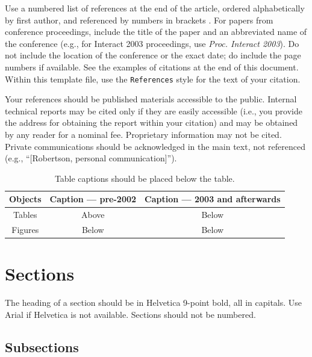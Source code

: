 \documentclass{sigchi}
\newcommand\tabhead[1]{\small\textbf{#1}}
\begin{document}
Use a numbered list of references at the end of the article, ordered
alphabetically by first author, and referenced by numbers in brackets
\cite{ethics,
  Klemmer:2002:WSC:503376.503378,
  Mather:2000:MUT,
  Zellweger:2001:FAO:504216.504224}. For
papers from conference proceedings, include the title of the paper and
an abbreviated name of the conference (e.g., for Interact 2003
proceedings, use \textit{Proc. Interact 2003}). Do not include the
location of the conference or the exact date; do include the page
numbers if available. See the examples of citations at the end of this
document. Within this template file, use the \texttt{References} style
for the text of your citation.

Your references should be published materials accessible to the
public.  Internal technical reports may be cited only if they are
easily accessible (i.e., you provide the address for obtaining the
report within your citation) and may be obtained by any reader for a
nominal fee.  Proprietary information may not be cited. Private
communications should be acknowledged in the main text, not referenced
(e.g., ``[Robertson, personal communication]'').

\begin{table}
  \centering
  \begin{tabular}{|c|c|c|}
    \hline
    \tabhead{Objects} &
    \multicolumn{1}{|p{0.3\columnwidth}|}{\centering\tabhead{Caption --- pre-2002}} &
    \multicolumn{1}{|p{0.4\columnwidth}|}{\centering\tabhead{Caption --- 2003 and afterwards}} \\
    \hline
    Tables & Above & Below \\
    \hline
    Figures & Below & Below \\
    \hline
  \end{tabular}
  \caption{Table captions should be placed below the table.}
  \label{tab:table1}
\end{table}

\section{Sections}

The heading of a section should be in Helvetica 9-point bold, all in
capitals. Use Arial if Helvetica is not available. Sections should
not be numbered.

\subsection{Subsections}
\end{document}
